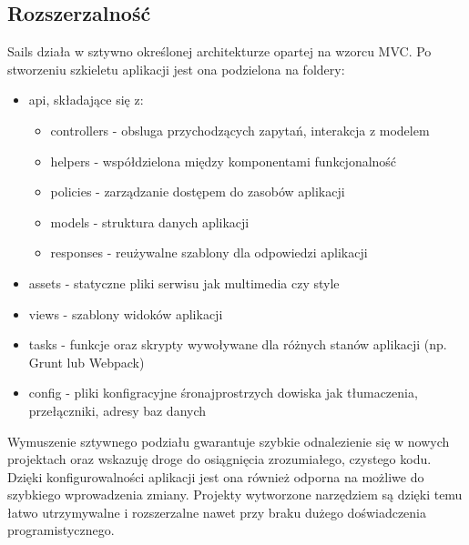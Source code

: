 \documentclass[12pt]{report}
\begin{document}
    \subsection{Rozszerzalność}
      Sails działa w sztywno określonej architekturze opartej na wzorcu MVC.
      Po stworzeniu szkieletu aplikacji jest ona podzielona na foldery:
      \begin{itemize}
        \item api, składające się z:
        \begin{itemize}
          \item controllers - obsluga przychodzących zapytań, interakcja z modelem
          \item helpers - współdzielona między komponentami funkcjonalność
          \item policies - zarządzanie dostępem do zasobów aplikacji
          \item models - struktura danych aplikacji
          \item responses - reużywalne szablony dla odpowiedzi aplikacji
        \end{itemize}
        \item assets - statyczne pliki serwisu jak multimedia czy style
        \item views - szablony widoków aplikacji
        \item tasks - funkcje oraz skrypty wywoływane dla różnych stanów aplikacji (np. Grunt lub Webpack)
        \item config - pliki konfigracyjne śronajprostrzych dowiska jak tłumaczenia, przełączniki, adresy baz danych
      \end{itemize}
      Wymuszenie sztywnego podziału gwarantuje szybkie odnalezienie się w nowych projektach oraz wskazuję droge do osiągnięcia zrozumiałego, czystego kodu.
      Dzięki konfigurowalności aplikacji jest ona również odporna na możliwe do szybkiego wprowadzenia zmiany.
      Projekty wytworzone narzędziem są dzięki temu łatwo utrzymywalne i rozszerzalne nawet przy braku dużego doświadczenia programistycznego. 
\end{document}
